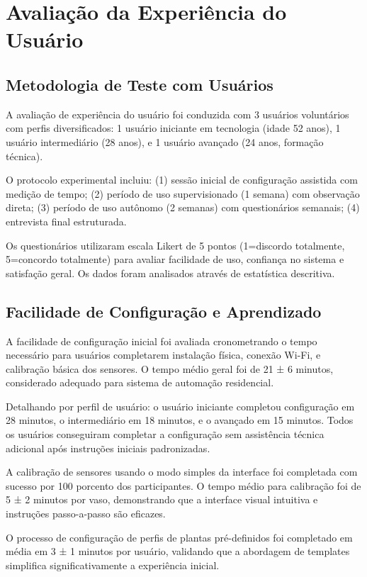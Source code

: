 \documentclass[twoside,english,brazilian]{UNISINOSmonografia}
\begin{document}
\section{Avaliação da Experiência do Usuário}

\subsection{Metodologia de Teste com Usuários}

A avaliação de experiência do usuário foi conduzida com 3 usuários voluntários com perfis diversificados: 1 usuário iniciante em tecnologia (idade 52 anos), 1 usuário intermediário (28 anos), e 1 usuário avançado (24 anos, formação técnica).

O protocolo experimental incluiu: (1) sessão inicial de configuração assistida com medição de tempo; (2) período de uso supervisionado (1 semana) com observação direta; (3) período de uso autônomo (2 semanas) com questionários semanais; (4) entrevista final estruturada.

Os questionários utilizaram escala Likert de 5 pontos (1=discordo totalmente, 5=concordo totalmente) para avaliar facilidade de uso, confiança no sistema e satisfação geral. Os dados foram analisados através de estatística descritiva.

\subsection{Facilidade de Configuração e Aprendizado}

A facilidade de configuração inicial foi avaliada cronometrando o tempo necessário para usuários completarem instalação física, conexão Wi-Fi, e calibração básica dos sensores. O tempo médio geral foi de 21 ± 6 minutos, considerado adequado para sistema de automação residencial.

Detalhando por perfil de usuário: o usuário iniciante completou configuração em 28 minutos, o intermediário em 18 minutos, e o avançado em 15 minutos. Todos os usuários conseguiram completar a configuração sem assistência técnica adicional após instruções iniciais padronizadas.

A calibração de sensores usando o modo simples da interface foi completada com sucesso por 100 porcento dos participantes. O tempo médio para calibração foi de 5 ± 2 minutos por vaso, demonstrando que a interface visual intuitiva e instruções passo-a-passo são eficazes.

O processo de configuração de perfis de plantas pré-definidos foi completado em média em 3 ± 1 minutos por usuário, validando que a abordagem de templates simplifica significativamente a experiência inicial.
\end{document}
